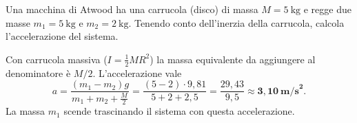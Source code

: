 
\begin{question}[ID=7.5, subtitle={Macchina di Atwood con carrucola massiva e due masse diverse}, tags={corpo rigido, macchina di Atwood, carrucola}, difficulty=media]
Una macchina di Atwood ha una carrucola (disco) di massa $M = 5\ \text{kg}$ e regge due masse $m_1 = 5\ \text{kg}$ e $m_2 = 2\ \text{kg}$. Tenendo conto dell'inerzia della carrucola, calcola l'accelerazione del sistema.
\begin{solution}
Con carrucola massiva ($I = \tfrac{1}{2}MR^2$) la massa equivalente da aggiungere al denominatore è $M/2$. L'accelerazione vale
\[
a = \frac{(m_1 - m_2)g}{m_1 + m_2 + \tfrac{M}{2}} = \frac{(5-2)\cdot 9{,}81}{5 + 2 + 2{,}5} = \frac{29{,}43}{9{,}5} \approx \mathbf{3{,}10\ \text{m/s}^2}.
\]
La massa $m_1$ scende trascinando il sistema con questa accelerazione.
\end{solution}
\end{question}
